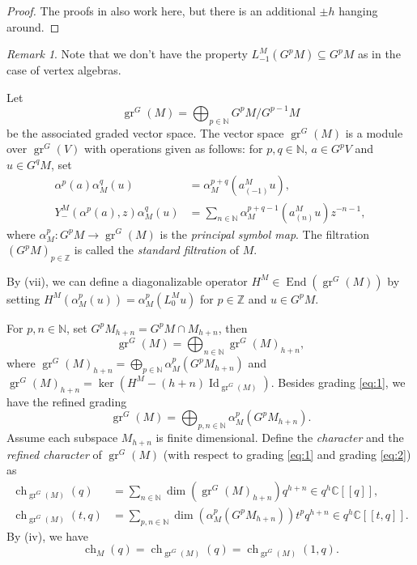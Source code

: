 \documentclass[a4paper, 12pt, reqno]{amsart}
\theoremstyle{remark}
\newtheorem{remark}[theorem]{Remark}
\DeclareMathOperator{\Id}{Id}
\DeclareMathOperator{\gr}{gr}
\DeclareMathOperator{\End}{End}
\DeclareMathOperator{\ch}{ch}
\begin{document}
\begin{proof}
  The proofs in \cite{li_vertex_2004} also work here, but there is an additional $\pm h$ hanging around.
\end{proof}

\begin{remark}
  \label{rmk:1}
  Note that we don't have the property $L_{-1}^M(G^pM) \subseteq G^pM$ as in the case of vertex algebras.
\end{remark}

Let
\begin{equation*}
  \gr^G(M) = \bigoplus_{p \in \mathbb{N}}G^pM/G^{p - 1}M
\end{equation*}
be the associated graded vector space.
The vector space $\gr^G(M)$ is a module over $\gr^G(V)$ with operations given as follows: for $p, q \in \mathbb{N}$, $a \in G^pV$ and $u \in G^qM$, set
\begin{align*}
  \alpha^p(a)\alpha_M^q(u) &= \alpha_M^{p + q}(a^M_{(-1)}u), \\
  Y^M_-(\alpha^p(a), z)\alpha_M^q(u) &= \sum_{n \in \mathbb{N}}\alpha_M^{p + q - 1}(a^M_{(n)}u)z^{-n - 1},
\end{align*}
where $\alpha_M^p: G^pM \to \gr^G(M)$ is the \emph{principal symbol map}.
The filtration $(G^pM)_{p \in \mathbb{Z}}$ is called the \emph{standard filtration} of $M$.

By (vii), we can define a diagonalizable operator $H^M \in \End(\gr^G(M))$ by setting $H^M(\alpha^p_M(u)) = \alpha^p_M(L^M_0u)$ for $p \in \mathbb{Z}$ and $u \in G^pM$.

For $p, n \in \mathbb{N}$, set $G^pM_{h + n} = G^pM \cap M_{h + n}$, then
\begin{equation}
  \label{eq:1}
  \gr^G(M) = \bigoplus_{n \in \mathbb{N}}\gr^G(M)_{h + n},
\end{equation}
where $\gr^G(M)_{h + n} = \bigoplus_{p \in \mathbb{N}}\alpha^p_M(G^pM_{h + n})$ and $\gr^G(M)_{h + n} = \ker(H^M - (h + n)\Id_{\gr^G(M)})$.
Besides grading \eqref{eq:1}, we have the refined grading
\begin{equation}
  \label{eq:2}
  \gr^G(M) = \bigoplus_{p, n \in \mathbb{N}}\alpha^p_M(G^pM_{h + n}).
\end{equation}
Assume each subspace $M_{h + n}$ is finite dimensional.
Define the \emph{character} and the \emph{refined character} of $\gr^G(M)$ (with respect to grading \eqref{eq:1} and grading \eqref{eq:2}) as
\begin{align*}
  \ch_{\gr^G(M)}(q) &= \sum_{n \in \mathbb{N}}\dim(\gr^G(M)_{h + n})q^{h + n} \in q^h\mathbb{C}[[q]], \\
  \ch_{\gr^G(M)}(t, q) &= \sum_{p, n \in \mathbb{N}}\dim(\alpha^p_M(G^pM_{h + n}))t^pq^{h + n} \in q^{h}\mathbb{C}[[t, q]].
\end{align*}
By (iv), we have
\begin{equation*}
  \ch_M(q) = \ch_{\gr^G(M)}(q) = \ch_{\gr^G(M)}(1, q).
\end{equation*}
\end{document}
